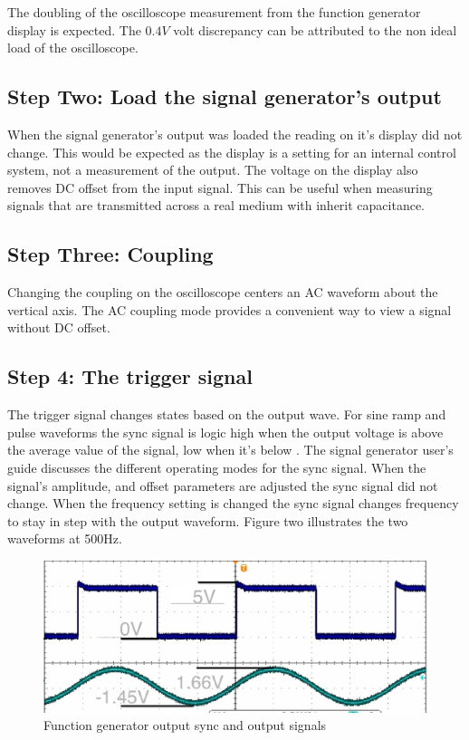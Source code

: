 \documentclass[11pt,journal]{IEEEtran}
\begin{document}
		The doubling of the oscilloscope measurement from the function generator display is expected. The $0.4V$ volt discrepancy
		can be attributed to the non ideal load of the oscilloscope.
	
	\subsection{Step Two: Load the signal generator's output}
		When the signal generator's output was loaded the reading on it's display did not change. This would be expected as the
		display is a setting for an internal control system, not a measurement of the output. The voltage on the display also removes 
		DC offset from the input signal. This can be useful when measuring signals that are transmitted across a real medium with 
		inherit capacitance.
		
	\subsection{Step Three: Coupling}
		Changing the coupling on the oscilloscope centers an AC waveform about the vertical axis. The AC coupling mode provides a convenient way to view
		a signal without DC offset.
			
	\subsection{Step 4: The trigger signal}
		The trigger signal changes states based on the output wave. For sine ramp and pulse waveforms the sync signal is
		logic high when the output voltage is above the average value of the signal, low when it's below \cite{3}. The signal generator user's guide discusses
		the different operating modes for the sync signal. When the signal's amplitude, and offset parameters are adjusted the sync signal did not change.
		When the frequency setting is changed the sync signal changes frequency to stay in step with the output waveform. Figure two illustrates the two waveforms at 500Hz.
	
	\begin{figure}[H]
		\includegraphics[width=.5\textwidth]{screenshot_25}
		\caption{Function generator output sync and output signals}
	\end{figure}
	
\end{document}
